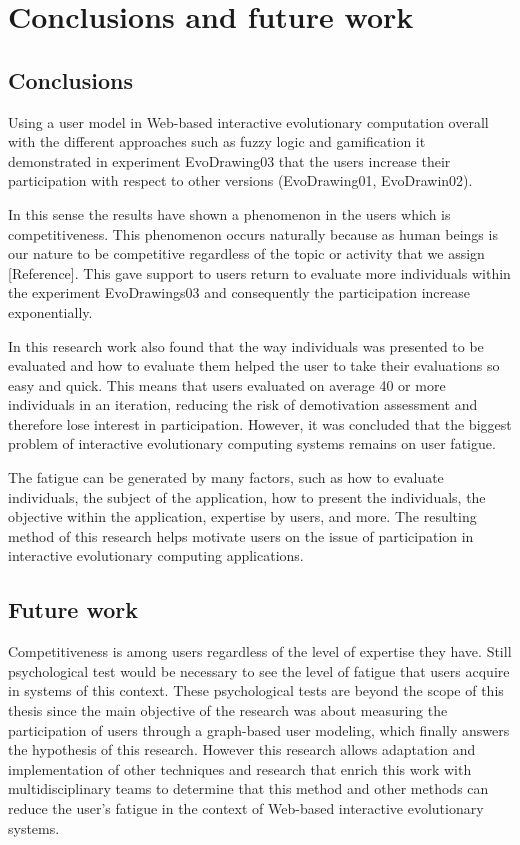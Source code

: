 \chapter{Conclusions and future work} \label{sec:5}

\section{Conclusions}

Using a user model in Web-based interactive evolutionary computation  overall
with the different approaches such as fuzzy logic and gamification it
demonstrated  in experiment EvoDrawing03 that the users increase their
participation with respect to other versions (EvoDrawing01, EvoDrawin02).

In this sense the results have shown a phenomenon in the users which is
competitiveness. This phenomenon occurs naturally because as human beings is our
nature to be competitive regardless of the topic or activity that we assign
[Reference]. This gave support to users return to evaluate more individuals
within the experiment EvoDrawings03 and consequently the participation increase
exponentially.

In this research work also found that the way individuals was presented to be
evaluated and how to evaluate them helped the user to take their evaluations so
easy and quick. This means that users evaluated on average 40 or more
individuals in an iteration, reducing the risk of demotivation assessment and
therefore lose interest in participation. However, it was concluded that the
biggest problem of interactive evolutionary computing systems remains on user
fatigue.

The fatigue can be generated by many factors, such as how to evaluate
individuals, the subject of the application, how to present the individuals, the
objective within the application, expertise by users, and more. The resulting
method of this research helps motivate users on the issue of participation in
interactive evolutionary computing applications.


\section{Future work}

Competitiveness is among users regardless of the level of expertise they have.
Still psychological test would be necessary to see the level of fatigue that
users acquire in systems of this context. These psychological tests are beyond
the scope of this thesis since the main objective of the research was about
measuring the participation of users through a graph-based user modeling, which
finally answers  the hypothesis of this research. However this research allows
adaptation and implementation of other techniques and research that enrich this
work with multidisciplinary teams to determine that this method and other
methods can reduce the user's fatigue in the context of Web-based interactive
evolutionary systems.

